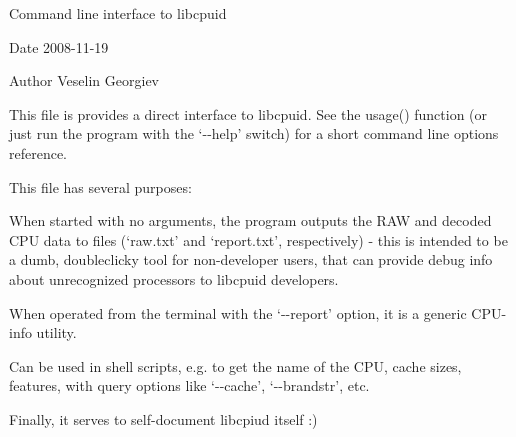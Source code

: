 Command line interface to libcpuid

\begin{DoxyDate}{Date}
2008-\/11-\/19 
\end{DoxyDate}
\begin{DoxyAuthor}{Author}
Veselin Georgiev
\end{DoxyAuthor}
This file is provides a direct interface to libcpuid. See the usage() function (or just run the program with the `-\/-\/help' switch) for a short command line options reference.

This file has several purposes\+:


\begin{DoxyEnumerate}
\item When started with no arguments, the program outputs the R\+AW and decoded C\+PU data to files (`raw.\+txt' and `report.\+txt', respectively) -\/ this is intended to be a dumb, doubleclicky tool for non-\/developer users, that can provide debug info about unrecognized processors to libcpuid developers.
\item When operated from the terminal with the `-\/-\/report' option, it is a generic C\+P\+U-\/info utility.
\item Can be used in shell scripts, e.\+g. to get the name of the C\+PU, cache sizes, features, with query options like `-\/-\/cache', `-\/-\/brandstr', etc.
\item Finally, it serves to self-\/document libcpiud itself \+:) 
\end{DoxyEnumerate}